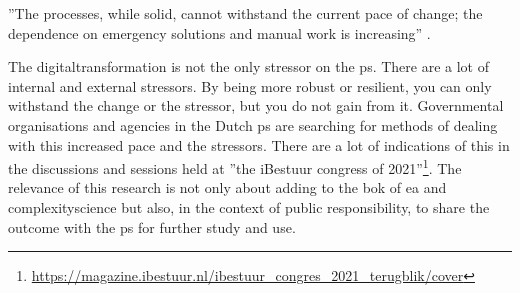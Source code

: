\begin{remark}
	''The processes, while solid, cannot withstand the current pace of change; the dependence on emergency solutions and manual work is increasing'' \parencite[p.~2]{Wiebes2014}.
\end{remark}

The \gls{digitaltransformation} is not the only \gls{stressor} on the \gls{ps}. There are a lot of internal and external \glspl{stressor}. By being more \gls{robust} or \gls{resilient}, you can only withstand the change or the \gls{stressor}, but you do not gain from it. Governmental organisations and agencies in the Dutch \gls{ps} are searching for methods of dealing with this increased pace and the stressors. There are a lot of indications of this in the discussions and sessions held at ''the iBestuur congress of 2021''\footnote{\url{https://magazine.ibestuur.nl/ibestuur_congres_2021_terugblik/cover}}. The relevance of this research is not only about adding to the \acrshort{bok} of \acrshort{ea} and \gls{complexityscience} but also, in the context of public responsibility, to share the outcome with the \gls{ps} for further study and use.

